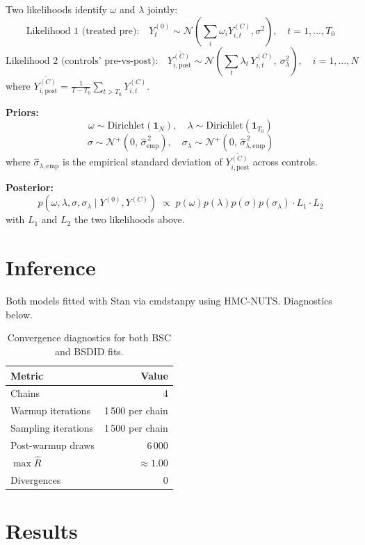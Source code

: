 \documentclass[a4paper,11pt]{article}
\begin{document}
Two likelihoods identify $\omega$ and $\lambda$ jointly:
$$\text{Likelihood 1 (treated pre):} \quad Y^{(0)}_t \sim \mathcal{N}\!\left(\sum_i \omega_i Y^{(C)}_{i, t}, \sigma^2\right), \quad t = 1, \ldots, T_0$$
$$\text{Likelihood 2 (controls' pre-vs-post):} \quad \overline{Y^{(C)}_{i, \text{post}}} \sim \mathcal{N}\!\left(\sum_t \lambda_t \, Y^{(C)}_{i, t},\ \sigma_\lambda^2\right), \quad i = 1, \ldots, N$$
where $\overline{Y^{(C)}_{i,\text{post}}} = \tfrac{1}{T - T_0} \sum_{t > T_0} Y^{(C)}_{i, t}$.

\textbf{Priors:}
$$\omega \sim \mathrm{Dirichlet}(\mathbf{1}_N), \quad \lambda \sim \mathrm{Dirichlet}(\mathbf{1}_{T_0})$$
$$\sigma \sim \mathcal{N}^{+}(0,\, \widehat{\sigma}_{\text{emp}}^{\,2}), \quad \sigma_\lambda \sim \mathcal{N}^{+}(0,\, \widehat{\sigma}_{\lambda,\text{emp}}^{\,2})$$
where $\widehat{\sigma}_{\lambda, \text{emp}}$ is the empirical standard deviation of
$\overline{Y^{(C)}_{i, \text{post}}}$ across controls.

\textbf{Posterior:}
$$p(\omega, \lambda, \sigma, \sigma_\lambda \mid Y^{(0)}, Y^{(C)}) \; \propto \; p(\omega) p(\lambda) p(\sigma) p(\sigma_\lambda) \cdot L_1 \cdot L_2$$
with $L_1$ and $L_2$ the two likelihoods above.

\section{Inference}

Both models fitted with Stan via cmdstanpy using HMC-NUTS. Diagnostics
below.

\begin{table}[H]
\centering
\begin{tabular}{l r}
\toprule
\textbf{Metric} & \textbf{Value} \\
\midrule
Chains              & 4 \\
Warmup iterations   & 1\,500 per chain \\
Sampling iterations & 1\,500 per chain \\
Post-warmup draws   & 6\,000 \\
$\max \widehat{R}$  & $\approx 1.00$ \\
Divergences         & 0 \\
\bottomrule
\end{tabular}
\caption{Convergence diagnostics for both BSC and BSDID fits.}
\end{table}

\section{Results}
\end{document}
